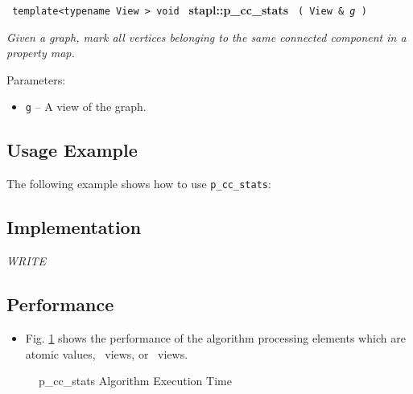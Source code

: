 \noindent
\texttt{%
template<typename View >
\newline
void 
}
\newline
\textbf{stapl::p\_cc\_stats}%
\newline
\texttt{%
(
View \&
\textit{g}%
)    
}
\vspace{0.4cm}

\textit{
Given a graph, mark all vertices belonging to the same connected component in a property map.
}
\vspace{0.4cm}

Parameters:
\begin{itemize}
\item
\texttt{g} --
A view of the graph.
\end{itemize}

\subsection{Usage Example} \label{sec-p-stats-cc-alg-use}

The following example shows how to use 
\texttt{p\_cc\_stats}:


\subsection{Implementation} \label{sec-p-stats-cc-alg-impl}

\textit{WRITE}

\subsection{Performance} \label{sec-p-stats-cc-alg-perf}

\begin{itemize}
\item
Fig. \ref{fig:p-cc-stats-alg-exec-exper}
shows the performance of the algorithm processing
elements which are atomic values, \stl\ views, or \stapl\ views.
\end{itemize}

\begin{figure}[p]
\caption{p\_cc\_stats Algorithm Execution Time}
\label{fig:p-cc-stats-alg-exec-exper}
\end{figure}

